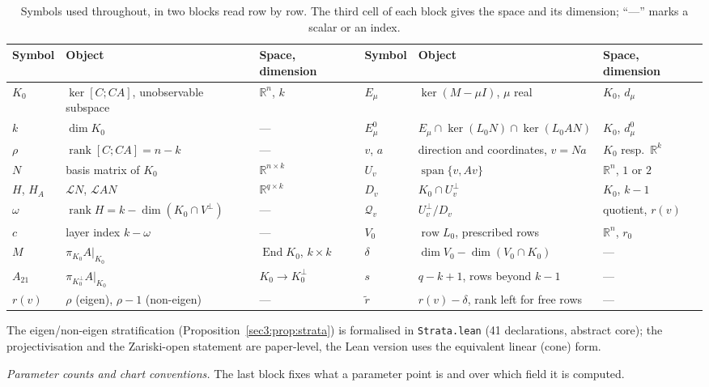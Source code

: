 \documentclass[journal]{IEEEtran}
\theoremstyle{plainn}
\theoremstyle{remark}
\newcommand{\row}{\operatorname{row}}
\newcommand{\rank}{\operatorname{rank}}
\begin{document}
\begin{table}[t]
\centering
\caption{Symbols used throughout, in two blocks read row by row. The third cell of each block gives
the space and its dimension; ``---'' marks a scalar or an index.}
\label{tab:notation}
\small
\begin{tabular}{@{}llllll@{}}
\toprule
Symbol & Object & Space, dimension & Symbol & Object & Space, dimension \\
\midrule
$K_0$ & $\ker[C;CA]$, unobservable subspace & $\mathbb R^n$, $k$ &
$E_\mu$ & $\ker(M-\mu I)$, $\mu$ real & $K_0$, $d_\mu$ \\
$k$ & $\dim K_0$ & --- &
$E_\mu^0$ & $E_\mu\cap\ker(L_0N)\cap\ker(L_0AN)$ & $K_0$, $d_\mu^0$ \\
$\rho$ & $\rank[C;CA]=n-k$ & --- &
$v$, $a$ & direction and coordinates, $v=Na$ & $K_0$ resp.\ $\mathbb R^k$ \\
$N$ & basis matrix of $K_0$ & $\mathbb R^{n\times k}$ &
$U_v$ & $\operatorname{span}\{v,Av\}$ & $\mathbb R^n$, $1$ or $2$ \\
$H$, $H_A$ & $\mathcal LN$, $\mathcal LAN$ & $\mathbb R^{q\times k}$ &
$D_v$ & $K_0\cap U_v^\perp$ & $K_0$, $k-1$ \\
$\omega$ & $\rank H=k-\dim(K_0\cap V^{\perp})$ & --- &
$\mathcal Q_v$ & $U_v^\perp/D_v$ & quotient, $r(v)$ \\
$c$ & layer index $k-\omega$ & --- &
$V_0$ & $\row L_0$, prescribed rows & $\mathbb R^n$, $r_0$ \\
$M$ & $\pi_{K_0}A|_{K_0}$ & $\operatorname{End}K_0$, $k\times k$ &
$\delta$ & $\dim V_0-\dim(V_0\cap K_0)$ & --- \\
$A_{21}$ & $\pi_{K_0^\perp}A|_{K_0}$ & $K_0\to K_0^\perp$ &
$s$ & $q-k+1$, rows beyond $k-1$ & --- \\
$r(v)$ & $\rho$ (eigen), $\rho-1$ (non-eigen) & --- &
$\widetilde r$ & $r(v)-\delta$, rank left for free rows & --- \\
\bottomrule
\end{tabular}
\end{table}

The eigen/non-eigen stratification (Proposition~\ref{sec3:prop:strata}) is formalised in \texttt{Strata.lean} (41 declarations, abstract core); the projectivisation and the Zariski-open statement are paper-level, the Lean version uses the equivalent linear (cone) form.


\emph{Parameter counts and chart conventions.} The last block fixes what a parameter point is and over
which field it is computed.
\end{document}
